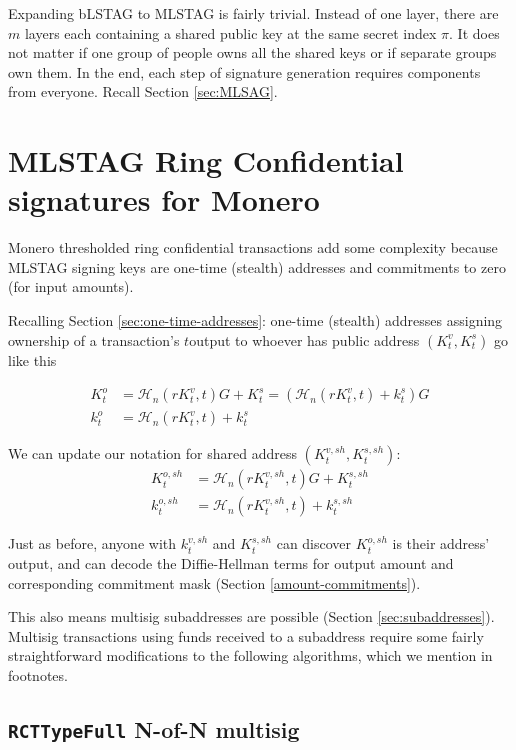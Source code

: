 Expanding bLSTAG to MLSTAG is fairly trivial. Instead of one layer, there are $m$ layers each containing a shared public key at the same secret index $\pi$. It does not matter if one group of people owns all the shared keys or if separate groups own them. In the end, each step of signature generation requires components from everyone. Recall Section \ref{sec:MLSAG}.



\section{MLSTAG Ring Confidential signatures for Monero}
\label{sec:MLSTAG-RingCT}

Monero thresholded ring confidential transactions add some complexity because MLSTAG signing keys are one-time (stealth) addresses and commitments to zero (for input amounts).

Recalling Section \ref{sec:one-time-addresses}: one-time (stealth) addresses assigning ownership of a transaction's $t$\nth output to whoever has public address $(K^v_t,K^s_t)$ go like this

\begin{align*}
  K_t^o &= \mathcal{H}_n(r K_t^v, t)G + K_t^s = (\mathcal{H}_n(r K_t^v, t) + k_t^s)G  \\ 
  k_t^o &= \mathcal{H}_n(r K_t^v, t) + k_t^s
\end{align*} 

We can update our notation for shared address $(K^{v,sh}_t,K^{s,sh}_t)$:
\begin{align*}
  K^{o,sh}_t &= \mathcal{H}_n(r K^{v,sh}_t, t)G + K^{s,sh}_t  \\ 
  k^{o,sh}_t &= \mathcal{H}_n(r K^{v,sh}_t, t) + k^{s,sh}_t
\end{align*}

Just as before, anyone with $k^{v,sh}_t$ and $K^{s,sh}_t$ can discover $K^{o,sh}_t$ is their address' output, and can decode the Diffie-Hellman terms for output amount and corresponding commitment mask (Section \ref{amount-commitments}). 

This also means multisig subaddresses are possible (Section \ref{sec:subaddresses}). Multisig transactions using funds received to a subaddress require some fairly straightforward modifications to the following algorithms, which we mention in footnotes.


\subsection{{\tt RCTTypeFull} N-of-N multisig}
\label{sec:rcttypefull-multisig}


